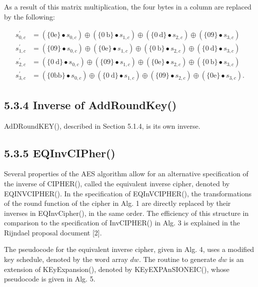 As a result of this matrix multiplication, the four bytes in a column are replaced by the following:

\[
\begin{aligned}
s_{0, c}^{\prime} & =\left(\{0 \mathrm{e}\} \bullet s_{0, c}\right) \oplus\left(\{0 \mathrm{~b}\} \bullet s_{1, c}\right) \oplus\left(\{0 \mathrm{~d}\} \bullet s_{2, c}\right) \oplus\left(\{09\} \bullet s_{3, c}\right) \\
s_{1, c}^{\prime} & =\left(\{09\} \bullet s_{0, c}\right) \oplus\left(\{0 \mathrm{e}\} \bullet s_{1, c}\right) \oplus\left(\{0 \mathrm{~b}\} \bullet s_{2, c}\right) \oplus\left(\{0 \mathrm{~d}\} \bullet s_{3, c}\right) \\
s_{2, c}^{\prime} & =\left(\{0 \mathrm{~d}\} \bullet s_{0, c}\right) \oplus\left(\{09\} \bullet s_{1, c}\right) \oplus\left(\{0 \mathrm{e}\} \bullet s_{2, c}\right) \oplus\left(\{0 \mathrm{~b}\} \bullet s_{3, c}\right) \\
s_{3, c}^{\prime} & =\left(\{0 \mathrm{bb}\} \bullet s_{0, c}\right) \oplus\left(\{0 \mathrm{~d}\} \bullet s_{1, c}\right) \oplus\left(\{09\} \bullet s_{2, c}\right) \oplus\left(\{0 \mathrm{e}\} \bullet s_{3, c}\right) .
\end{aligned}
\]

\subsection*{5.3.4 Inverse of AddRoundKey()}
AdDRoundKEY(), described in Section 5.1.4, is its own inverse.

\subsection*{5.3.5 EQInvCIPher()}
Several properties of the AES algorithm allow for an alternative specification of the inverse of CIPHER(), called the equivalent inverse cipher, denoted by EQINVCIPHER(). In the specification of EQInVCIPHER(), the transformations of the round function of the cipher in Alg. 1 are directly replaced by their inverses in EQInvCipher(), in the same order. The efficiency of this structure in comparison to the specification of InvCIPHER() in Alg. 3 is explained in the Rijndael proposal document [2].

The pseudocode for the equivalent inverse cipher, given in Alg. 4, uses a modified key schedule, denoted by the word array \(d w\). The routine to generate \(d w\) is an extension of KEyExpansion(), denoted by KEyEXPAnSIONEIC(), whose pseudocode is given in Alg. 5.

